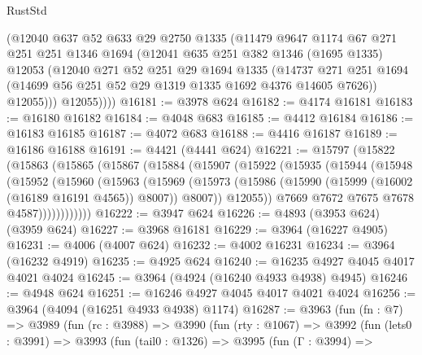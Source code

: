 \begin{lexlean}{RustStd}
\begin{coremodule}
          (@12040
            @637
            @52
            @633
            @29
            @2750
            @1335
            (@11479
              @9647
              @1174
              @67
              @271
              @251
              @251
              @1346
              @1694
              (@12041
                @635
                @251
                @382
                @1346
                (@1695 @1335)
                @12053
                (@12040
                  @271
                  @52
                  @251
                  @29
                  @1694
                  @1335
                  (@14737
                    @271
                    @251
                    @1694
                    (@14699 @56 @251 @52 @29 @1319 @1335 @1692 @4376 @14605 @7626))
                  @12055)))
            @12055))))
@16181 := @3978 @624
@16182 := @4174 @16181
@16183 := @16180 @16182
@16184 := @4048 @683
@16185 := @4412 @16184
@16186 := @16183 @16185
@16187 := @4072 @683
@16188 := @4416 @16187
@16189 := @16186 @16188
@16191 := @4421 (@4441 @624)
@16221 := @15797
    (@15822
      (@15863
        (@15865
          (@15867
            (@15884
              (@15907
                (@15922
                  (@15935
                    (@15944
                      (@15948
                        (@15952
                          (@15960
                            (@15963
                              (@15969
                                (@15973
                                  (@15986
                                    (@15990 (@15999 (@16002 (@16189 @16191 @4565)) @8007))
                                    @8007))
                                @12055))
                            @7669
                            @7672
                            @7675
                            @7678
                            @4587))))))))))))
@16222 := @3947 @624
@16226 := @4893 (@3953 @624) (@3959 @624)
@16227 := @3968 @16181
@16229 := @3964 (@16227 @4905)
@16231 := @4006 (@4007 @624)
@16232 := @4002 @16231
@16234 := @3964 (@16232 @4919)
@16235 := @4925 @624
@16240 := @16235 @4927 @4045 @4017 @4021 @4024
@16245 := @3964 (@4924 (@16240 @4933 @4938) @4945)
@16246 := @4948 @624
@16251 := @16246 @4927 @4045 @4017 @4021 @4024
@16256 := @3964 (@4094 (@16251 @4933 @4938) @1174)
@16287 := @3963
    (fun (fn : @7) =>
    @3989
      (fun (rc : @3988) =>
      @3990
        (fun (rty : @1067) =>
        @3992
          (fun (lets0 : @3991) =>
          @3993
            (fun (tail0 : @1326) =>
            @3995
              (fun (Γ : @3994) =>

\end{coremodule}
\end{lexlean}
